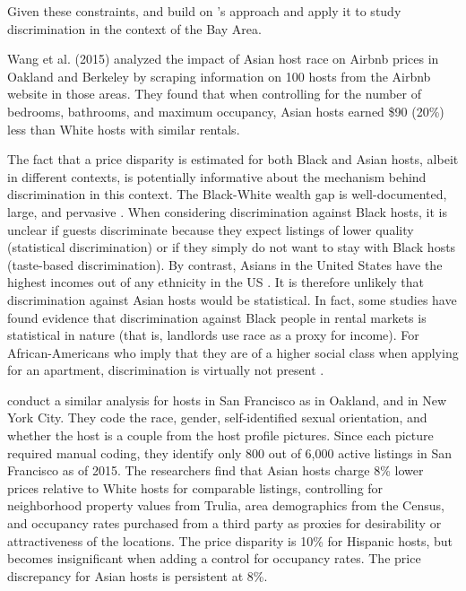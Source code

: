 Given these constraints, \cite{wang} and \cite{kakar} build on \cite{edelman}'s approach and apply it to study discrimination in the context of the Bay Area. 

Wang et al. (2015) analyzed the impact of Asian host race on Airbnb prices in Oakland and Berkeley by scraping information on 100 hosts from the Airbnb website in those areas. They found that when controlling for the number of bedrooms, bathrooms, and maximum occupancy, Asian hosts earned \$90 (20\%) less than White hosts with similar rentals. 

The fact that a price disparity is estimated for both Black and Asian hosts, albeit in different contexts, is potentially informative about the mechanism behind discrimination in this context. The Black-White wealth gap is well-documented, large, and pervasive \citep{cfed, heywood, bayard, mason, chiteji, altonji, gittleman}. When considering discrimination against Black hosts, it is unclear if guests discriminate because they expect listings of lower quality (statistical discrimination) or if they simply do not want to stay with Black hosts (taste-based discrimination). By contrast, Asians in the United States have the highest incomes out of any ethnicity in the US \citep{income}. It is therefore unlikely that discrimination against Asian hosts would be statistical. In fact, some studies have found evidence that discrimination against Black people in rental markets is statistical in nature (that is, landlords use race as a proxy for income). For African-Americans who imply that they are of a higher social class when applying for an apartment, discrimination is virtually not present \citep{hanson}.

\cite{kakar} conduct a similar analysis for hosts in San Francisco as \cite{wang} in Oakland, and \cite{edelman} in New York City. They code the race, gender, self-identified sexual orientation, and whether the host is a couple from the host profile pictures. Since each picture required manual coding, they identify only 800 out of 6,000 active listings in San Francisco as of 2015. The researchers find that Asian hosts charge 8\% lower prices relative to White hosts for comparable listings, controlling for neighborhood property values from Trulia, area demographics from the Census, and occupancy rates purchased from a third party as proxies for desirability or attractiveness of the locations. The price disparity is 10\% for Hispanic hosts, but becomes insignificant when adding a control for occupancy rates. The price discrepancy for Asian hosts is persistent at 8\%. 


